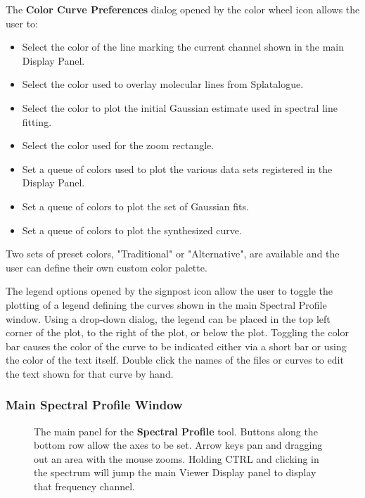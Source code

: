 The {\bf Color Curve Preferences} dialog opened by the color wheel icon allows the user to:

\begin{itemize}
\item Select the color of the line marking the current channel shown in the main Display Panel.
\item Select the color used to overlay molecular lines from Splatalogue.
\item Select the color to plot the initial Gaussian estimate used in spectral line fitting.
\item Select the color used for the zoom rectangle.
\item Set a queue of colors used to plot the various data sets registered in the Display Panel.
\item Set a queue of colors to plot the set of Gaussian fits.
\item Set a queue of colors to plot the synthesized curve.
\end{itemize}

Two sets of preset colors, "Traditional" or "Alternative", are available and the user can define
their own custom color palette.

The legend options opened by the signpost icon allow the user to toggle the plotting of
a legend defining the curves shown in the main Spectral Profile window. Using a drop-down 
dialog, the legend can be placed in the top left corner of the plot, to the right of the plot, or below the plot. 
Toggling the color bar causes the color of the curve to be indicated either via a short bar or using
the color of the text itself. Double click the names of the files or curves to edit the text shown for that curve 
by hand.

\subsubsection{Main Spectral Profile Window}
\label{section:display.image.specprof.mainwindow}

\begin{figure}[h!]
\begin{center}
\caption{\label{fig:viewer_specmain} The main panel for the {\bf Spectral Profile} tool. Buttons along
the bottom row allow the axes to be set. Arrow keys pan and dragging out an area with the mouse zooms.
Holding CTRL and clicking in the spectrum will jump the main Viewer Display panel to display that
frequency channel.}
\hrulefill
\end{center}
\end{figure}

